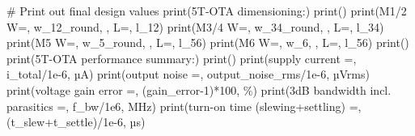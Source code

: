 \documentclass[
  a4paper,
  DIV=11,
  numbers=noendperiod]{scrartcl}
\newenvironment{Shaded}{\begin{snugshade}}{\end{snugshade}}
\newcommand{\BuiltInTok}[1]{\textcolor[rgb]{0.00,0.23,0.31}{#1}}
\newcommand{\CommentTok}[1]{\textcolor[rgb]{0.37,0.37,0.37}{#1}}
\newcommand{\DecValTok}[1]{\textcolor[rgb]{0.68,0.00,0.00}{#1}}
\newcommand{\FloatTok}[1]{\textcolor[rgb]{0.68,0.00,0.00}{#1}}
\newcommand{\NormalTok}[1]{\textcolor[rgb]{0.00,0.23,0.31}{#1}}
\newcommand{\OperatorTok}[1]{\textcolor[rgb]{0.37,0.37,0.37}{#1}}
\newcommand{\StringTok}[1]{\textcolor[rgb]{0.13,0.47,0.30}{#1}}
\begin{document}
\begin{tcolorbox}
\begin{Shaded}
\begin{Highlighting}[]
\CommentTok{\# Print out final design values}
\BuiltInTok{print}\NormalTok{(}\StringTok{\textquotesingle{}5T{-}OTA dimensioning:\textquotesingle{}}\NormalTok{)}
\BuiltInTok{print}\NormalTok{(}\StringTok{\textquotesingle{}{-}{-}{-}{-}{-}{-}{-}{-}{-}{-}{-}{-}{-}{-}{-}{-}{-}{-}{-}{-}\textquotesingle{}}\NormalTok{)}
\BuiltInTok{print}\NormalTok{(}\StringTok{\textquotesingle{}M1/2 W=\textquotesingle{}}\NormalTok{, w\_12\_round, }\StringTok{\textquotesingle{}, L=\textquotesingle{}}\NormalTok{, l\_12)}
\BuiltInTok{print}\NormalTok{(}\StringTok{\textquotesingle{}M3/4 W=\textquotesingle{}}\NormalTok{, w\_34\_round, }\StringTok{\textquotesingle{}, L=\textquotesingle{}}\NormalTok{, l\_34)}
\BuiltInTok{print}\NormalTok{(}\StringTok{\textquotesingle{}M5   W=\textquotesingle{}}\NormalTok{, w\_5\_round, }\StringTok{\textquotesingle{}, L=\textquotesingle{}}\NormalTok{, l\_56)}
\BuiltInTok{print}\NormalTok{(}\StringTok{\textquotesingle{}M6   W=\textquotesingle{}}\NormalTok{, w\_6, }\StringTok{\textquotesingle{}, L=\textquotesingle{}}\NormalTok{, l\_56)}
\BuiltInTok{print}\NormalTok{()}
\BuiltInTok{print}\NormalTok{(}\StringTok{\textquotesingle{}5T{-}OTA performance summary:\textquotesingle{}}\NormalTok{)}
\BuiltInTok{print}\NormalTok{(}\StringTok{\textquotesingle{}{-}{-}{-}{-}{-}{-}{-}{-}{-}{-}{-}{-}{-}{-}{-}{-}{-}{-}{-}{-}{-}{-}{-}{-}{-}{-}{-}\textquotesingle{}}\NormalTok{)}
\BuiltInTok{print}\NormalTok{(}\StringTok{\textquotesingle{}supply current =\textquotesingle{}}\NormalTok{, i\_total}\OperatorTok{/}\FloatTok{1e{-}6}\NormalTok{, }\StringTok{\textquotesingle{}µA\textquotesingle{}}\NormalTok{)}
\BuiltInTok{print}\NormalTok{(}\StringTok{\textquotesingle{}output noise =\textquotesingle{}}\NormalTok{, output\_noise\_rms}\OperatorTok{/}\FloatTok{1e{-}6}\NormalTok{, }\StringTok{\textquotesingle{}µVrms\textquotesingle{}}\NormalTok{)}
\BuiltInTok{print}\NormalTok{(}\StringTok{\textquotesingle{}voltage gain error =\textquotesingle{}}\NormalTok{, (gain\_error}\OperatorTok{{-}}\DecValTok{1}\NormalTok{)}\OperatorTok{*}\DecValTok{100}\NormalTok{, }\StringTok{\textquotesingle{}\%\textquotesingle{}}\NormalTok{)}
\BuiltInTok{print}\NormalTok{(}\StringTok{\textquotesingle{}{-}3dB bandwidth incl. parasitics =\textquotesingle{}}\NormalTok{, f\_bw}\OperatorTok{/}\FloatTok{1e6}\NormalTok{, }\StringTok{\textquotesingle{}MHz\textquotesingle{}}\NormalTok{)}
\BuiltInTok{print}\NormalTok{(}\StringTok{\textquotesingle{}turn{-}on time (slewing+settling) =\textquotesingle{}}\NormalTok{, (t\_slew}\OperatorTok{+}\NormalTok{t\_settle)}\OperatorTok{/}\FloatTok{1e{-}6}\NormalTok{, }\StringTok{\textquotesingle{}µs\textquotesingle{}}\NormalTok{)}

\end{Highlighting}
\end{Shaded}
\end{tcolorbox}
\end{document}
